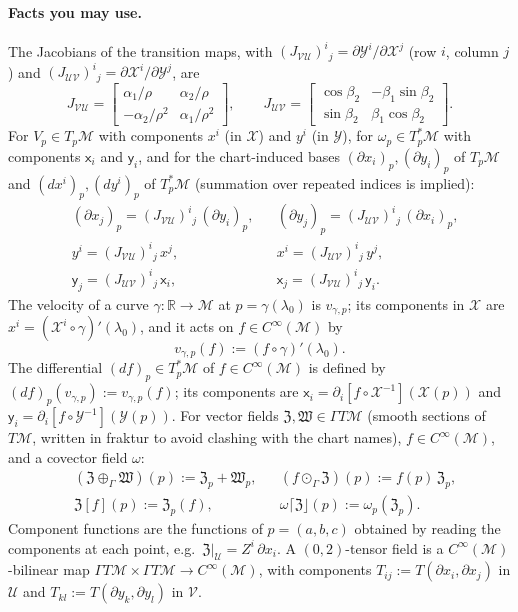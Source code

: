 \documentclass[11pt]{article}
\newcommand{\Cinf}{C^\infty(\mathcal M)}
\begin{document}
\paragraph{Facts you may use.} The Jacobians of the transition maps, with $(J_{\mathcal{VU}})^i{}_j=\partial\mathcal Y^i/\partial\mathcal X^j$
(row $i$, column $j$) and $(J_{\mathcal{UV}})^i{}_j=\partial\mathcal X^i/\partial\mathcal Y^j$, are
\[
J_{\mathcal{VU}}=\begin{bmatrix}\alpha_1/\rho & \alpha_2/\rho\\ -\alpha_2/\rho^2 & \alpha_1/\rho^2\end{bmatrix},\qquad
J_{\mathcal{UV}}=\begin{bmatrix}\cos\beta_2 & -\beta_1\sin\beta_2\\ \sin\beta_2 & \beta_1\cos\beta_2\end{bmatrix}.
\]
For $V_p\in T_p\mathcal M$ with components $x^i$ (in $\mathcal X$) and $y^i$ (in $\mathcal Y$), for $\omega_p\in T_p^*\mathcal M$ with components $\mathsf x_i$
and $\mathsf y_i$, and for the chart-induced bases $(\partial x_i)_p,(\partial y_i)_p$ of $T_p\mathcal M$ and $(dx^i)_p,(dy^i)_p$ of $T_p^*\mathcal M$
(summation over repeated indices is implied):
\begin{align*}
&(\partial x_j)_p=(J_{\mathcal{VU}})^i{}_j\,(\partial y_i)_p, &&(\partial y_j)_p=(J_{\mathcal{UV}})^i{}_j\,(\partial x_i)_p,\\
&y^i=(J_{\mathcal{VU}})^i{}_j\,x^j, &&x^i=(J_{\mathcal{UV}})^i{}_j\,y^j,\\
&\mathsf y_j=(J_{\mathcal{UV}})^i{}_j\,\mathsf x_i, &&\mathsf x_j=(J_{\mathcal{VU}})^i{}_j\,\mathsf y_i.
\end{align*}
The velocity of a curve $\gamma:\mathbb R\to\mathcal M$ at $p=\gamma(\lambda_0)$ is $v_{\gamma,p}$; its components in $\mathcal X$ are
$x^i=(\mathcal X^i\circ\gamma)'(\lambda_0)$, and it acts on $f\in\Cinf$ by
\[
v_{\gamma,p}(f):=(f\circ\gamma)'(\lambda_0).
\]
The differential $(df)_p\in T_p^*\mathcal M$ of $f\in\Cinf$ is defined by $(df)_p(v_{\gamma,p}):=v_{\gamma,p}(f)$; its components are
$\mathsf x_i=\partial_i[f\circ\mathcal X^{-1}](\mathcal X(p))$ and $\mathsf y_i=\partial_i[f\circ\mathcal Y^{-1}](\mathcal Y(p))$.
For vector fields $\mathfrak Z,\mathfrak W\in\Gamma T\mathcal M$ (smooth sections of $T\mathcal M$, written in fraktur to avoid clashing with the chart names), $f\in\Cinf$, and a covector field $\omega$:
\begin{align*}
&(\mathfrak Z\oplus_\Gamma\mathfrak W)(p):=\mathfrak Z_p+\mathfrak W_p, &&(f\odot_\Gamma\mathfrak Z)(p):=f(p)\,\mathfrak Z_p,\\
&\mathfrak Z[f](p):=\mathfrak Z_p(f), &&\omega\lceil\mathfrak Z\rfloor(p):=\omega_p(\mathfrak Z_p).
\end{align*}
Component functions are the functions of $p=(a,b,c)$ obtained by reading the components at each point, e.g.\ $\mathfrak Z|_{\mathcal U}=Z^i\,\partial x_i$.
A $(0,2)$-tensor field is a $C^\infty(\mathcal M)$-bilinear map $\Gamma T\mathcal M\times\Gamma T\mathcal M\to\Cinf$, with components
$T_{ij}:=T(\partial x_i,\partial x_j)$ in $\mathcal U$ and $T_{kl}:=T(\partial y_k,\partial y_l)$ in $\mathcal V$.
\end{document}
